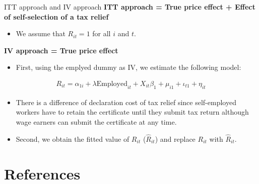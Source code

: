 \documentclass[
  ignorenonframetext,
  aspectratio=169,
]{beamer}
\providecommand{\tightlist}{%
  \setlength{\itemsep}{0pt}\setlength{\parskip}{0pt}}
\begin{document}
\begin{frame}{ITT approach and IV approach}
\protect\hypertarget{itt-approach-and-iv-approach}{}
\textbf{ITT approach = True price effect + Effect of self-selection of a tax relief}

\begin{itemize}
\tightlist
\item
  We assume that \(R_{it} = 1\) for all \(i\) and \(t\).
\end{itemize}

\textbf{IV approach = True price effect}

\begin{itemize}
\tightlist
\item
  First, using the emplyed dummy as IV, we estimate the following model:
\end{itemize}

\begin{align}
  R_{it}
  = \alpha_{1i} + \lambda \text{Employed}_{it} + X_{it} \beta_1
  + \mu_{i1} + \iota_{t1} + \eta_{it} \label{eq:stage1}
\end{align}

\begin{itemize}
\tightlist
\item
  There is a difference of declaration cost of tax relief since self-employed workers have to retain the certificate until they submit tax return although wage earners can submit the certificate at any time.\\
\item
  Second, we obtain the fitted value of \(R_{it}\) (\(\hat{R}_{it}\)) and replace \(R_{it}\) with \(\hat{R}_{it}\).
\end{itemize}

\clearpage
\end{frame}

\hypertarget{references}{%
\section*{References}\label{references}}
\end{document}
